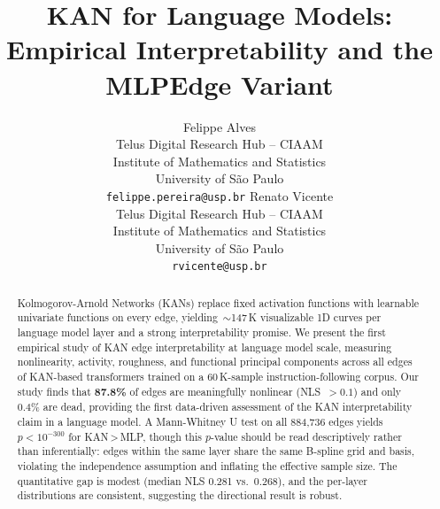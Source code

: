 \documentclass{article}
\title{KAN for Language Models: Empirical Interpretability and the MLPEdge Variant}
\author{%
  Felippe Alves \\
  Telus Digital Research Hub -- CIAAM \\
  Institute of Mathematics and Statistics \\
  University of São Paulo \\
  \texttt{felippe.pereira@usp.br}
  \And
  Renato Vicente \\
  Telus Digital Research Hub -- CIAAM \\
  Institute of Mathematics and Statistics \\
  University of São Paulo \\
  \texttt{rvicente@usp.br}
}
\begin{document}
\maketitle

\begin{abstract}
Kolmogorov-Arnold Networks (KANs) replace fixed activation functions with
learnable univariate functions on every edge, yielding~$\sim$147\,K visualizable
1D curves per language model layer and a strong interpretability promise.
We present the first empirical study of KAN edge interpretability at language
model scale, measuring nonlinearity, activity, roughness, and functional
principal components across all edges of KAN-based transformers trained on a
60\,K-sample instruction-following corpus.
Our study finds that \textbf{87.8\%} of edges are meaningfully nonlinear
(NLS~$>0.1$) and only 0.4\% are dead, providing the first data-driven
assessment of the KAN interpretability claim in a language model.
A Mann-Whitney U test on all 884,736 edges yields $p < 10^{-300}$ for KAN\,>\,MLP,
though this $p$-value should be read descriptively rather than inferentially: edges
within the same layer share the same B-spline grid and basis, violating the
independence assumption and inflating the effective sample size.
The quantitative gap is modest (median NLS 0.281 vs.\ 0.268), and the per-layer
distributions are consistent, suggesting the directional result is robust.


\end{abstract}
\end{document}
